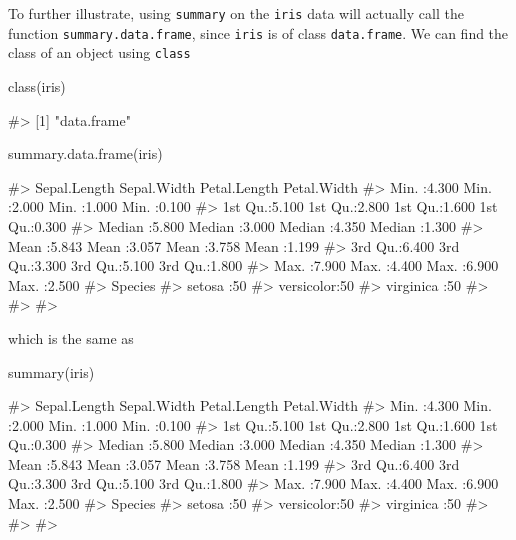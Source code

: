 To further illustrate, using \texttt{summary} on the \texttt{iris} data
will actually call the function \texttt{summary.data.frame}, since
\texttt{iris} is of class \texttt{data.frame}. We can find the class of
an object using \texttt{class}

\begin{Schunk}
\begin{Sinput}
class(iris)
\end{Sinput}
\begin{Soutput}
#> [1] "data.frame"
\end{Soutput}
\end{Schunk}

\begin{Schunk}
\begin{Sinput}
summary.data.frame(iris)
\end{Sinput}
\begin{Soutput}
#>   Sepal.Length    Sepal.Width     Petal.Length    Petal.Width   
#>  Min.   :4.300   Min.   :2.000   Min.   :1.000   Min.   :0.100  
#>  1st Qu.:5.100   1st Qu.:2.800   1st Qu.:1.600   1st Qu.:0.300  
#>  Median :5.800   Median :3.000   Median :4.350   Median :1.300  
#>  Mean   :5.843   Mean   :3.057   Mean   :3.758   Mean   :1.199  
#>  3rd Qu.:6.400   3rd Qu.:3.300   3rd Qu.:5.100   3rd Qu.:1.800  
#>  Max.   :7.900   Max.   :4.400   Max.   :6.900   Max.   :2.500  
#>        Species  
#>  setosa    :50  
#>  versicolor:50  
#>  virginica :50  
#>                 
#>                 
#> 
\end{Soutput}
\end{Schunk}

which is the same as

\begin{Schunk}
\begin{Sinput}
summary(iris)
\end{Sinput}
\begin{Soutput}
#>   Sepal.Length    Sepal.Width     Petal.Length    Petal.Width   
#>  Min.   :4.300   Min.   :2.000   Min.   :1.000   Min.   :0.100  
#>  1st Qu.:5.100   1st Qu.:2.800   1st Qu.:1.600   1st Qu.:0.300  
#>  Median :5.800   Median :3.000   Median :4.350   Median :1.300  
#>  Mean   :5.843   Mean   :3.057   Mean   :3.758   Mean   :1.199  
#>  3rd Qu.:6.400   3rd Qu.:3.300   3rd Qu.:5.100   3rd Qu.:1.800  
#>  Max.   :7.900   Max.   :4.400   Max.   :6.900   Max.   :2.500  
#>        Species  
#>  setosa    :50  
#>  versicolor:50  
#>  virginica :50  
#>                 
#>                 
#> 
\end{Soutput}
\end{Schunk}

